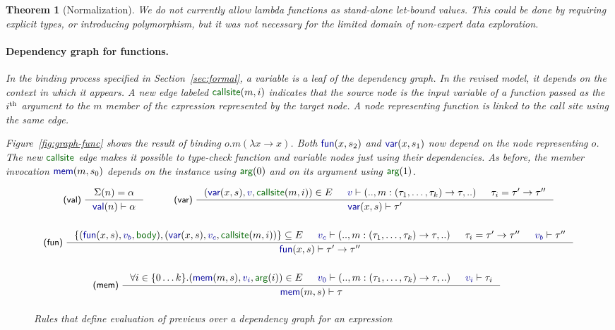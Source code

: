 \documentclass[acmsmall,anonymous,fleqn]{acmart}\settopmatter{printfolios=false,printccs=false,printacmref=false}
\newcounter{thc}
\theoremstyle{plain}
\newtheorem{theorem}[thc]{Theorem}
\theoremstyle{definition}
\newcommand{\bndclr}[1]{\textcolor{kvdclr}{#1}}
\newcommand{\bnd}[1]{\textnormal{\textcolor{kvdclr}{\sffamily #1}}}
\newcommand{\blbl}[1]{\textnormal{\textcolor{numclr}{\sffamily #1}}}
\newcommand{\rname}[1]{{\sffamily\small(#1)}}
\begin{document}
\begin{theorem}[Normalization]
We do not currently allow lambda functions as stand-alone let-bound
values. This could be done by requiring explicit types, or introducing polymorphism, but it was not
necessary for the limited domain of non-expert data exploration.

\paragraph{Dependency graph for functions.}
In the binding process specified in Section~\ref{sec:formal}, a variable is a leaf of the dependency
graph. In the revised model, it depends on the context in which it appears. A new edge labeled
$\blbl{callsite}(m, i)$ indicates that the source node is the input variable of a function
passed as the $i^\textnormal{th}$ argument to the $m$ member of the expression represented by the
target node. A node representing function is linked to the call site using the same edge.

Figure~\ref{fig:graph-func} shows the result of binding $o.m(\lambda x\rightarrow x)$. Both
$\bnd{fun}(x, s_2)$ and $\bnd{var}(x, s_1)$ now depend on the node representing $o$. The new
$\blbl{callsite}$ edge makes it possible to type-check function and variable nodes just using their
dependencies. As before, the member invocation $\bnd{mem}(m, s_0)$
depends on the instance using $\blbl{arg}(0)$ and on its argument using $\blbl{arg}(1)$.


\begin{figure}
\vspace{0.5em}
\begin{equation*}
\begin{array}{l}
\qquad\inference[\rname{val}~]
  {\Sigma(n) = \alpha}
  {\bnd{val}(n) \vdash \alpha }
\quad\qquad
\inference[\rname{var}~]
  { (\bnd{var}(x,s), \bndclr{v}, \blbl{callsite}(m, i)) \in E &
    \bndclr{v} \vdash (.., m:(\tau_1, \ldots, \tau_k)\rightarrow \tau,..) & \tau_i=\tau'\rightarrow\tau'' }
  { \bnd{var}(x, s) \vdash \tau' }
\\[2.5em]
\inference[\rname{fun}~]
  { \{(\bnd{fun}(x,s), \bndclr{v_b}, \blbl{body}), (\bnd{var}(x,s), \bndclr{v_c}, \blbl{callsite}(m, i))\} \subseteq E &
    \bndclr{v_c} \vdash (.., m:(\tau_1, \ldots, \tau_k)\rightarrow \tau,..) &
    \tau_i=\tau'\rightarrow\tau'' & \bndclr{v_b} \vdash \tau'' }
  { \bnd{fun}(x, s) \vdash \tau' \rightarrow \tau'' }
\\[2.5em]
\qquad\qquad\quad\inference[\rname{mem}~]
  { \forall i\in\{0\ldots k\}.(\bnd{mem}(m, s), \bndclr{v_i}, \blbl{arg}(i)) \in E &
    \bndclr{v_0} \vdash (.., m:(\tau_1, \ldots, \tau_k) \rightarrow \tau, ..)& \bndclr{v_i} \vdash \tau_i }
  { \bnd{mem}(m, s) \vdash \tau }
\\[1em]
\end{array}
\end{equation*}
\caption{Rules that define evaluation of previews over a dependency graph for an expression}
\vspace{0.5em}
\label{fig:tc}
\end{figure}


\end{theorem}
\end{document}

